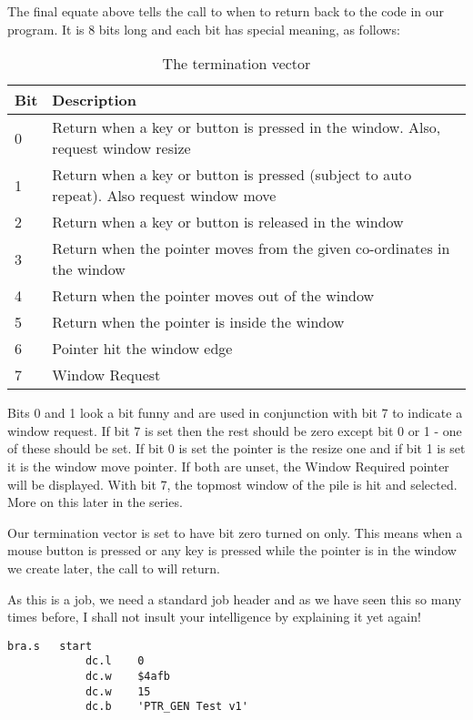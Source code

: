 The final equate above tells the call to  when to return back to the code in
our program. It is 8 bits long and each bit has special meaning, as follows:
\begin{table}[htbp]
\centering
\begin{tabular}{l p{}}
\toprule
\textbf{Bit} & \textbf{Description} \\
\midrule
%
0 & Return when a key or button is pressed in the window. Also, request window resize \\
1 & Return when a key or button is pressed (subject to auto repeat). Also request window move \\
2 & Return when a key or button is released in the window \\
3 & Return when the pointer moves from the given co-ordinates in the window \\
4 & Return when the pointer moves out of the window \\
5 & Return when the pointer is inside the window \\
6 & Pointer hit the window edge \\
7 & Window Request \\
%
\bottomrule
\end{tabular}
\caption{The termination vector}
\label{tab:TerminationVector}
\end{table}

Bits 0 and 1 look a bit funny and are used in conjunction with bit 7 to indicate a
window request. If bit 7 is set then the rest should be zero except bit 0 or 1 -{} one of
these should be set. If bit 0 is set the pointer is the resize one and if bit 1 is set it
is the window move pointer. If both are unset, the Window Required pointer will be
displayed. With bit 7, the topmost window of the pile is hit and selected. More on this
later in the series.

Our termination vector is set to have bit zero turned on only. This means when a
mouse button is pressed or any key is pressed while the pointer is in the window we create
later, the call to  will return.

As this is a job, we need a standard job header and as we have seen this so many
times before, I shall not insult your intelligence by explaining it yet again!

\begin{lstlisting}[firstnumber=last,caption={Simple PE Program - Part 2}]
            bra.s   start
            dc.l    0
            dc.w    $4afb
            dc.w    15
            dc.b    'PTR_GEN Test v1'
\end{lstlisting}

